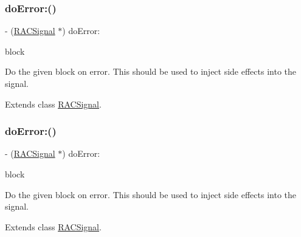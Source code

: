 \subsubsection{\texorpdfstring{do\+Error\+:()}{doError:()}\hspace{0.1cm}{\footnotesize\ttfamily [2/3]}}
{\footnotesize\ttfamily -\/ (\mbox{\hyperlink{interface_r_a_c_signal}{R\+A\+C\+Signal}} $\ast$) do\+Error\+: \begin{DoxyParamCaption}\item[{(void($^\wedge$)(N\+S\+Error $\ast$error))}]{block }\end{DoxyParamCaption}}

Do the given block on {\ttfamily error}. This should be used to inject side effects into the signal. 

Extends class \mbox{\hyperlink{interface_r_a_c_signal_ac97a1fc7c03123a75746f2602b7444b4}{R\+A\+C\+Signal}}.

\mbox{\label{category_r_a_c_signal_07_operations_08_ac97a1fc7c03123a75746f2602b7444b4}} 
\subsubsection{\texorpdfstring{do\+Error\+:()}{doError:()}\hspace{0.1cm}{\footnotesize\ttfamily [3/3]}}
{\footnotesize\ttfamily -\/ (\mbox{\hyperlink{interface_r_a_c_signal}{R\+A\+C\+Signal}} $\ast$) do\+Error\+: \begin{DoxyParamCaption}\item[{(void($^\wedge$)(N\+S\+Error $\ast$error))}]{block }\end{DoxyParamCaption}}

Do the given block on {\ttfamily error}. This should be used to inject side effects into the signal. 

Extends class \mbox{\hyperlink{interface_r_a_c_signal_ac97a1fc7c03123a75746f2602b7444b4}{R\+A\+C\+Signal}}.

\mbox{\label{category_r_a_c_signal_07_operations_08_a36028c2d987159f5210840358f4877c9}} 
